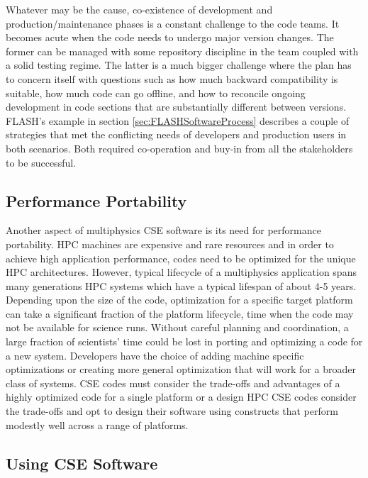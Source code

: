 Whatever may be the cause, co-existence of development and
production/maintenance phases is a constant challenge to the code
teams. It becomes acute when the code needs to undergo major version
changes. The former can be managed with some repository
discipline in the team coupled with a solid testing regime. The latter
is a much bigger challenge where the plan has to concern itself with
questions such as how much backward compatibility is suitable, how
much code can go offline, and how to reconcile ongoing development in
code sections that are substantially different between versions.
FLASH's example in section \ref{sec:FLASHSoftwareProcess} describes
a couple of strategies that met the conflicting needs of developers and
production users in both scenarios. Both required co-operation and
buy-in from all the stakeholders to be successful. 


\subsection{Performance Portability}
\label{sec:perfport}

Another aspect of multiphysics CSE software is its need for
performance portability. HPC machines are expensive and rare resources and in order to achieve high application performance, codes need to be optimized for the unique HPC architectures.
 However, typical lifecycle of a
multiphysics application spans many generations HPC systems which have a typical lifespan of about 4-5 years.  Depending upon the size of the
code, optimization for a specific target platform can take a
significant fraction of the platform lifecycle, time when the code may not be available for science runs.  Without careful planning and coordination,  a
large fraction of scientists' time could be lost in porting and optimizing
a code for a new system.  Developers have the choice of adding machine specific optimizations or creating more general optimization that will work for a broader class of systems.  CSE codes must consider the trade-offs and advantages of a highly optimized code for a single platform or a design 
HPC CSE codes consider the trade-offs and opt to design their software
using constructs that perform modestly well across a range of
platforms. 



\subsection{Using CSE Software}

